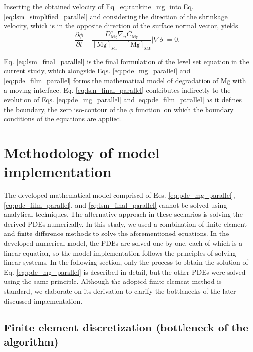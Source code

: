 Inserting the obtained velocity of Eq. \ref{eq:rankine_mg} into Eq. \ref{eq:lsm_simplified_parallel} and considering the direction of the shrinkage velocity, which is in the opposite direction of the surface normal vector, yields
\begin{equation} \label{eq:lsm_final_parallel}
\frac{\partial \phi}{\partial t}-\frac{D_{\mathrm{Mg}}^{e} \nabla_{n} C_\mathrm{Mg}}{[\mathrm{Mg}]_{\mathrm{sol}}-[\mathrm{Mg}]_{\mathrm{sat}}}|\nabla \phi|=0.
\end{equation}

Eq. \ref{eq:lsm_final_parallel} is the final formulation of the level set equation in the current study, which alongside Eqs. \ref{eq:pde_mg_parallel} and \ref{eq:pde_film_parallel} forms the mathematical model of degradation of Mg with a moving interface. Eq. \ref{eq:lsm_final_parallel} contributes indirectly to the evolution of Eqs. \ref{eq:pde_mg_parallel} and \ref{eq:pde_film_parallel} as it defines the boundary, the zero iso-contour of the $\phi$ function, on which the boundary conditions of the equations are applied.


\section{Methodology of model implementation}

The developed mathematical model comprised of Eqs. \ref{eq:pde_mg_parallel}, \ref{eq:pde_film_parallel}, and \ref{eq:lsm_final_parallel} cannot be solved using analytical techniques. The alternative approach in these scenarios is solving the derived {PDE}s numerically. In this study, we used a combination of finite element and finite difference methods to solve the aforementioned equations. In the developed numerical model, the {PDE}s are solved one by one, each of which is a linear equation, so the model implementation follows the principles of solving linear systems. In the following section, only the process to obtain the solution of Eq. \ref{eq:pde_mg_parallel} is described in detail, but the other {PDE}s were solved using the same principle. Although the adopted finite element method is standard, we elaborate on its derivation to clarify the bottlenecks of the later-discussed implementation.

\subsection[Finite element discretization]{Finite element discretization (bottleneck of the algorithm)}

